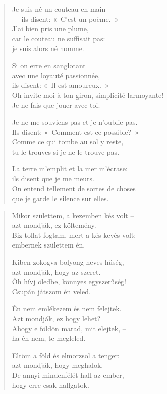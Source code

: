 \documentclass[11pt]{extbook}
\newcommand*{\centeredornament}{\centerline{\pgfornament[width=6cm]{88}}}
\begin{document}
\begin{verse}
  Je suis né un couteau en main \\
  --- ils disent: «~C'est un poème.~» \\
  J'ai bien pris une plume, \\
  car le couteau ne suffisait pas: \\
  je suis alors né homme.

  Si on erre en sanglotant \\
  avec une loyauté passionnée, \\
  ils disent: «~Il est amoureux.~» \\
  Oh invite-moi à ton giron, simplicité larmoyante!\hspace*{-1mm} \\
  Je ne fais que jouer avec toi.

  Je ne me souviens pas et je n'oublie pas. \\
  Ils disent: «~Comment est-ce possible?~» \\
  Comme ce qui tombe au sol y reste, \\
  tu le trouves si je ne le trouve pas.

  La terre m'emplit et la mer m'écrase: \\
  ils disent que je me meurs. \\
  On entend tellement de sortes de choses \\
  que je garde le silence sur elles.
\end{verse}

\newpage

\vspace*{-15mm}
\centeredornament



\begin{verse}
  Mikor születtem, a kezemben kés volt -- \\
  azt mondják, ez költemény. \\
  Biz tollat fogtam, mert a kés kevés volt: \\
  embernek születtem én.

  Kiben zokogva bolyong heves hűség, \\
  azt mondják, hogy az szeret. \\
  Óh hívj öledbe, könnyes egyszerűség! \\
  Csupán játszom én veled.

  Én nem emlékezem és nem felejtek. \\
  Azt mondják, ez hogy lehet? \\
  Ahogy e földön marad, mit elejtek, -- \\
  ha én nem, te megleled.

  Eltöm a föld és elmorzsol a tenger: \\
  azt mondják, hogy meghalok. \\
  De annyi mindenfélét hall az ember, \\
  hogy erre csak hallgatok.
\end{verse}
\end{document}
